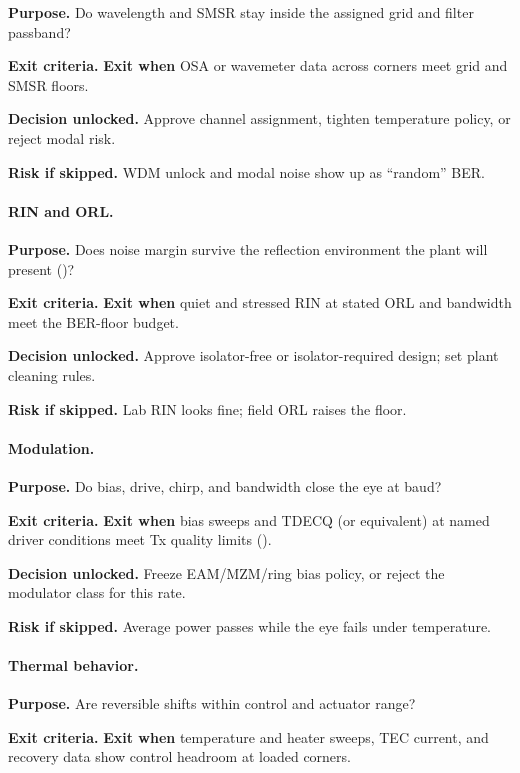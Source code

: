 \textbf{Purpose.}
Do wavelength and SMSR stay inside the assigned grid and filter passband?

\textbf{Exit criteria.}
\textbf{Exit when} OSA or wavemeter data across corners meet grid and SMSR
floors.

\textbf{Decision unlocked.}
Approve channel assignment, tighten temperature policy, or reject modal risk.

\textbf{Risk if skipped.}
WDM unlock and modal noise show up as ``random'' BER.

\paragraph{RIN and ORL.}

\textbf{Purpose.}
Does noise margin survive the reflection environment the plant will present
()?

\textbf{Exit criteria.}
\textbf{Exit when} quiet and stressed RIN at stated ORL and bandwidth meet
the BER-floor budget.

\textbf{Decision unlocked.}
Approve isolator-free or isolator-required design; set plant cleaning rules.

\textbf{Risk if skipped.}
Lab RIN looks fine; field ORL raises the floor.

\paragraph{Modulation.}

\textbf{Purpose.}
Do bias, drive, chirp, and bandwidth close the eye at baud?

\textbf{Exit criteria.}
\textbf{Exit when} bias sweeps and TDECQ (or equivalent) at named driver
conditions meet Tx quality limits ().

\textbf{Decision unlocked.}
Freeze EAM/MZM/ring bias policy, or reject the modulator class for this rate.

\textbf{Risk if skipped.}
Average power passes while the eye fails under temperature.

\paragraph{Thermal behavior.}

\textbf{Purpose.}
Are reversible shifts within control and actuator range?

\textbf{Exit criteria.}
\textbf{Exit when} temperature and heater sweeps, TEC current, and recovery
data show control headroom at loaded corners.

